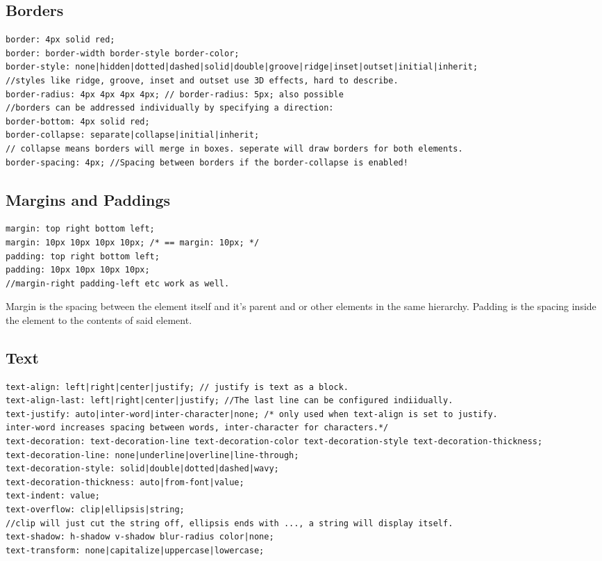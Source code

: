 \documentclass[main.tex,fontsize=6pt,paper=a4,paper=landscape,DIV=calc,]{scrartcl}
\begin{document}
\begin{multicols*}{4}
\subsection{Borders}
\vspace{-2mm}
\begin{lstlisting}
border: 4px solid red;
border: border-width border-style border-color;
border-style: none|hidden|dotted|dashed|solid|double|groove|ridge|inset|outset|initial|inherit;
//styles like ridge, groove, inset and outset use 3D effects, hard to describe.
border-radius: 4px 4px 4px 4px; // border-radius: 5px; also possible
//borders can be addressed individually by specifying a direction:
border-bottom: 4px solid red;
border-collapse: separate|collapse|initial|inherit;
// collapse means borders will merge in boxes. seperate will draw borders for both elements.
border-spacing: 4px; //Spacing between borders if the border-collapse is enabled!
\end{lstlisting}
\vspace{2mm}


\subsection{Margins and Paddings}
\vspace{-2mm}
\begin{lstlisting}
margin: top right bottom left;
margin: 10px 10px 10px 10px; /* == margin: 10px; */
padding: top right bottom left;
padding: 10px 10px 10px 10px;
//margin-right padding-left etc work as well.
\end{lstlisting}
\vspace{2mm}
Margin is the spacing between the element itself and it's parent and or other elements in the same hierarchy.\newline
Padding is the spacing inside the element to the contents of said element.

\subsection{Text}
\vspace{-2mm}
\begin{lstlisting}
text-align: left|right|center|justify; // justify is text as a block.
text-align-last: left|right|center|justify; //The last line can be configured indiidually.
text-justify: auto|inter-word|inter-character|none; /* only used when text-align is set to justify.
inter-word increases spacing between words, inter-character for characters.*/
text-decoration: text-decoration-line text-decoration-color text-decoration-style text-decoration-thickness;
text-decoration-line: none|underline|overline|line-through;
text-decoration-style: solid|double|dotted|dashed|wavy;
text-decoration-thickness: auto|from-font|value;
text-indent: value;
text-overflow: clip|ellipsis|string; 
//clip will just cut the string off, ellipsis ends with ..., a string will display itself.
text-shadow: h-shadow v-shadow blur-radius color|none;
text-transform: none|capitalize|uppercase|lowercase;
\end{lstlisting}
\vspace{2mm}


\end{multicols*}
\end{document}
